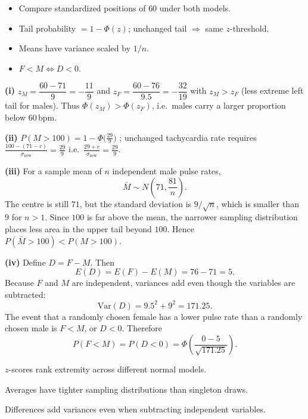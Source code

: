 \begin{hint}
\begin{itemize}[leftmargin=*]
  \item Compare standardized positions of $60$ under both models.
  \item Tail probability $=1-\Phi(z)$; unchanged tail $\Rightarrow$ same $z$-threshold.
  \item Means have variance scaled by $1/n$.
  \item $F<M \iff D<0$.
\end{itemize}
\end{hint}

\begin{solution}
\textbf{(i)} $z_{M}=\dfrac{60-71}{9}=-\dfrac{11}{9}$ and $z_{F}=\dfrac{60-76}{9{.}5}=-\dfrac{32}{19}$ with $z_{M}>z_{F}$ (less extreme left tail for males). Thus $\Phi(z_{M})>\Phi(z_{F})$, i.e.\ males carry a larger proportion below $60$\,bpm.

\textbf{(ii)} $P(M>100)=1-\Phi\big(\tfrac{29}{9}\big)$ ; unchanged tachycardia rate requires $\displaystyle\frac{100-(71-c)}{\sigma_{\mathrm{new}}}=\frac{29}{9}$ i.e.\ $\displaystyle\frac{29+c}{\sigma_{\mathrm{new}}}=\frac{29}{9}$.

\textbf{(iii)} For a sample mean of $n$ independent male pulse rates,
\[
\bar M\sim N\!\left(71,\frac{81}{n}\right).
\]
The centre is still $71$, but the standard deviation is $9/\sqrt n$, which is smaller than $9$ for $n>1$. Since $100$ is far above the mean, the narrower sampling distribution places less area in the upper tail beyond $100$. Hence $P(\bar M>100)<P(M>100)$.

\textbf{(iv)} Define $D=F-M$. Then
\[
E(D)=E(F)-E(M)=76-71=5.
\]
Because $F$ and $M$ are independent, variances add even though the variables are subtracted:
\[
\mathrm{Var}(D)=9{.}5^2+9^2=171{.}25.
\]
The event that a randomly chosen female has a lower pulse rate than a randomly chosen male is $F<M$, or $D<0$. Therefore
\[
P(F<M)=P(D<0)=\Phi\!\left(\frac{0-5}{\sqrt{171{.}25}}\right).
\]
\end{solution}

\begin{takeaways}
\item $z$-scores rank extremity across different normal models.
\item Averages have tighter sampling distributions than singleton draws.
\item Differences add variances even when subtracting independent variables.
\end{takeaways}

